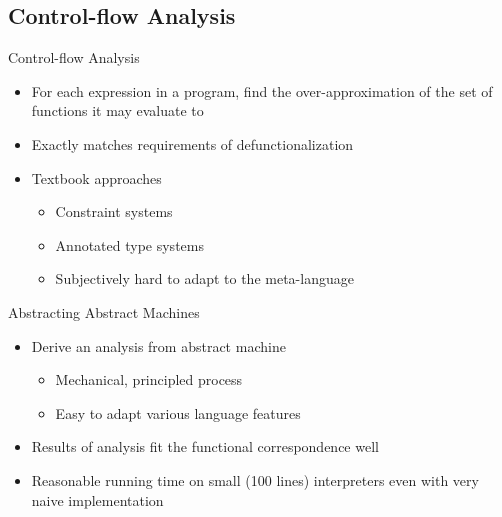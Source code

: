 \documentclass{beamer}
\begin{document}
\subsection{Control-flow Analysis}

\begin{frame}{Control-flow Analysis}
  \begin{itemize}
    \item For each expression in a program, find the over-approximation of the set of functions it may evaluate to
    \item Exactly matches requirements of defunctionalization
    \pause
    \item Textbook approaches
    \begin{itemize}
      \item Constraint systems
      \item Annotated type systems
      \item Subjectively hard to adapt to the meta-language
    \end{itemize}
  \end{itemize}
\end{frame}

\begin{frame}{Abstracting Abstract Machines}
  \begin{itemize}
    \item Derive an analysis from abstract machine
    \begin{itemize}
      \item Mechanical, principled process
      \item Easy to adapt various language features
    \end{itemize}
    \item Results of analysis fit the functional correspondence well
    \item Reasonable running time on small (100 lines) interpreters even with very naive implementation
  \end{itemize}
\end{frame}



\end{document}
